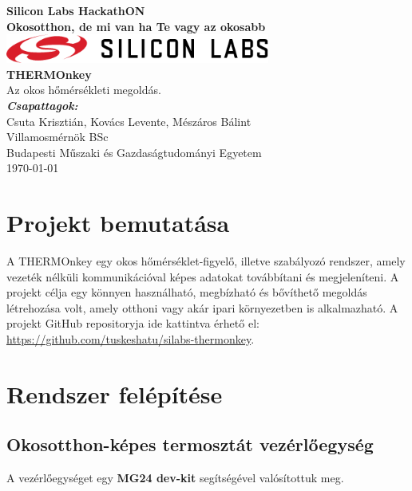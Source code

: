 \documentclass[12pt,a4paper]{article}
\begin{document}
\begin{titlepage}
    \centering
    \vspace*{\fill}
    \textbf{\Huge Silicon Labs HackathON}\\[1cm]
    \textbf{\Large Okosotthon, de mi van ha Te vagy az okosabb}\\[2cm]
    \includegraphics[width=0.65\textwidth]{figures/silabs-logo.png}\\[2cm]
    \textbf{\Large THERMOnkey}\\[0.5cm]
    \Large Az okos hőmérsékleti megoldás.\\[2cm]
    \Large \textbf{\textit{Csapattagok:}}\\[0.25cm]
    \Large Csuta Krisztián, Kovács Levente, Mészáros Bálint\\[0.25cm]
    Villamosmérnök BSc\\
    Budapesti Műszaki és Gazdaságtudományi Egyetem\\[2cm]
    \Large \today
    \vspace*{\fill}
\end{titlepage}

\newpage


\section{Projekt bemutatása}

A THERMOnkey egy okos hőmérséklet-figyelő, illetve szabályozó rendszer, amely vezeték nélküli kommunikációval képes adatokat továbbítani és megjeleníteni.
A projekt célja egy könnyen használható, megbízható és bővíthető megoldás létrehozása volt, amely otthoni vagy akár ipari környezetben is alkalmazható.
A projekt GitHub repositoryja ide kattintva érhető el: \href{https://github.com/tuskeshatu/silabs-thermonkey}{https://github.com/tuskeshatu/silabs-thermonkey}.

\section{Rendszer felépítése}

\subsection{Okosotthon-képes termosztát vezérlőegység}
A vezérlőegységet egy \textbf{MG24 dev-kit} segítségével valósítottuk meg. 
\end{document}
